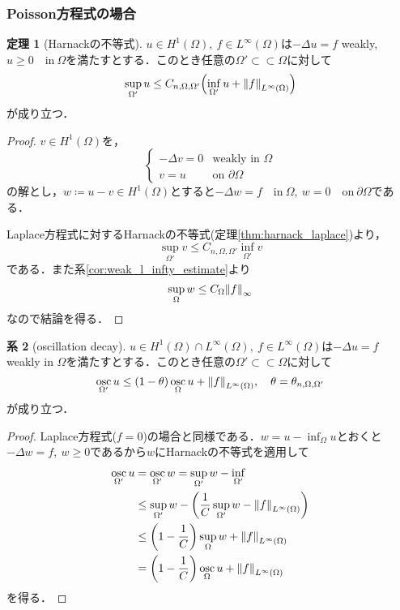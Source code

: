 \documentclass[a4paper]{ltjsarticle}
\newcommand{\Om}{\Omega}
\newcommand{\pOm}{\partial\Omega}
\newcommand{\ssubset}{\subset\subset}
\newcommand{\inn}{\quad\text{in}\ }
\newcommand{\on}{\quad \text{on}\ }
\newcommand{\1}{\mathbbm{1}}
\DeclareMathOperator*{\osc}{\mathrm{osc}}
\numberwithin{equation}{section}
\theoremstyle{definition}
\newtheorem{thm}{定理}[section]
\newtheorem{cor}[thm]{系}
\begin{document}
\subsubsection{Poisson方程式の場合}
\begin{thm}[Harnackの不等式]
    $u\in H^1(\Om),\ f\in L^\infty(\Om)$は$-\Delta u=f$ weakly, $u\geq0\inn\Om$を満たすとする．このとき任意の$\Om'\ssubset\Om$に対して
    \begin{equation}
        \sup_{\Om'}u\leq C_{n,\Om,\Om'}\qty(\inf_{\Om'}u+\norm{f}_{L^\infty(\Om)})
    \end{equation}
    が成り立つ．
\end{thm}
\begin{proof}
    $v\in H^1(\Om)$を，
    \begin{equation}
        \left\{
            \begin{array}{rl}
                -\Delta v = 0 & \text{weakly in $\Om$}\\
                v=u & \text{on $\pOm$}
            \end{array}
        \right.
    \end{equation}
    の解とし，$w\coloneqq u-v\in H^1(\Om)$とすると$-\Delta w=f\inn \Om,\ w=0\on \pOm$である．

    Laplace方程式に対するHarnackの不等式(定理\ref{thm:harnack_laplace})より，
    \begin{equation}
        \sup_{\Om'}v\leq C_{n,\Om,\Om'}\inf_{\Om'}v 
    \end{equation}
    である．また系\ref{cor:weak_l_infty_estimate}より
    \begin{equation}
        \sup_{\Om}w\leq C_{\Om}\norm{f}_{\infty}
    \end{equation}
    なので結論を得る．
\end{proof}
\begin{cor}[oscillation decay]
    $u\in H^1(\Om)\cap L^\infty(\Om),\ f\in L^\infty(\Om)$は$-\Delta u=f$ weakly in $\Om$を満たすとする．このとき任意の$\Om'\ssubset\Om$に対して
    \begin{equation}
        \osc_{\Om'}u\leq (1-\theta)\osc_{\Om}u+\norm{f}_{L^\infty(\Om)},\quad \theta=\theta_{n,\Om,\Om'}
    \end{equation}
    が成り立つ．
\end{cor}
\begin{proof}
    Laplace方程式($f=0$)の場合と同様である．$w=u-\inf_{\Om}u$とおくと$-\Delta w=f,\ w\geq0$であるから$w$にHarnackの不等式を適用して
    \begin{align}
        \osc_{\Om'}u&=\osc_{\Om'}w=\sup_{\Om'}w-\inf_{\Om'}\\
        &\leq \sup_{\Om'}w-\qty(\frac{1}{C}\sup_{\Om'}w-\norm{f}_{L^\infty(\Om)})\\
        &\leq \qty(1-\frac{1}{C})\sup_{\Om}w+\norm{f}_{L^\infty(\Om)}\\
        &=\qty(1-\frac{1}{C})\osc_{\Om}u+\norm{f}_{L^\infty(\Om)}
    \end{align}
    を得る．
\end{proof}
\end{document}
